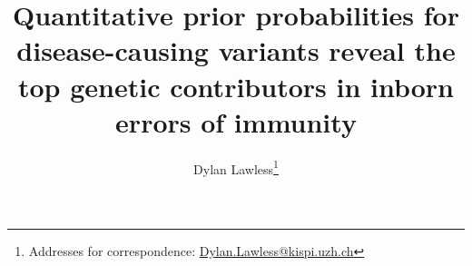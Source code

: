 
\usepackage[printonlyused,withpage,nohyperlinks]{acronym}
\usepackage{tikz}
\usetikzlibrary{calc}
\usepackage{amsmath, amssymb}


\title{Quantitative prior probabilities for disease-causing variants reveal the top genetic contributors in inborn errors of immunity}


\author[1]{Dylan Lawless\thanks{Addresses for correspondence: \href{mailto:Dylan.Lawless@kispi.uzh.ch}{Dylan.Lawless@kispi.uzh.ch}}}

\maketitle
\justify
\linenumbers



